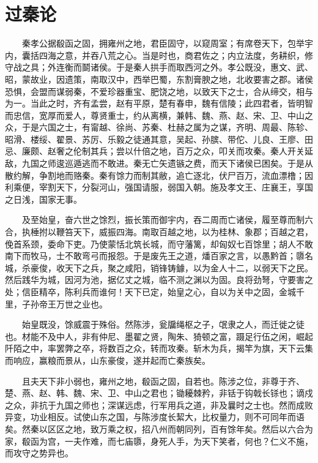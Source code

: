 \section{过秦论}


　　秦孝公据殽函之固，拥雍州之地，君臣固守，以窥周室；有席卷天下，包举宇内，囊括四海之意，并吞八荒之心。当是时也，商君佐之；内立法度，务耕织，修守战之具；外连衡而鬬诸侯。于是秦人拱手而取西河之外。孝公既没，惠文、武、昭，蒙故业，因遗策，南取汉中，西举巴蜀，东割膏腴之地，北收要害之郡。诸侯恐惧，会盟而谋弱秦，不爱珍器重宝、肥饶之地，以致天下之士，合从缔交，相与为一。当此之时，齐有孟尝，赵有平原，楚有春申，魏有信陵；此四君者，皆明智而忠信，宽厚而爱人，尊贤重士，约从离横，兼韩、魏、燕、赵、宋、卫、中山之众，于是六国之士，有甯越、徐尚、苏秦、杜赫之属为之谋，齐明、周最、陈轸、昭滑、楼绥、翟景、苏厉、乐毅之徒通其意，吴起、孙膑、带佗、儿良、王廖、田忌、廉颇、赵奢之伦制其兵；尝以什倍之地，百万之众，叩关而攻秦。秦人开关延敌，九国之师逡巡遁逃而不敢进。秦无亡矢遗镞之费，而天下诸侯已困矣。于是从散约解，争割地而赂秦。秦有馀力而制其敝，追亡逐北，伏尸百万，流血漂橹；因利乘便，宰割天下，分裂河山，强国请服，弱国入朝。施及孝文王、庄襄王，享国之日浅，国家无事。


　　及至始皇，奋六世之馀烈，振长策而御宇内，吞二周而亡诸侯，履至尊而制六合，执棰拊以鞭笞天下，威振四海。南取百越之地，以为桂林、象郡；百越之君，俛首系颈，委命下吏。乃使蒙恬北筑长城，而守藩篱，却匈奴七百馀里；胡人不敢南下而牧马，士不敢弯弓而报怨。于是废先王之道，燔百家之言，以愚黔首；隳名城，杀豪俊，收天下之兵，聚之咸阳，销锋铸鐻，以为金人十二，以弱天下之民。然后践华为城，因河为池，据亿丈之城，临不测之渊以为固。良将劲弩，守要害之处；信臣精卒，陈利兵而谁何！天下已定，始皇之心，自以为关中之固，金城千里，子孙帝王万世之业也。


　　始皇既没，馀威震于殊俗。然陈涉，瓮牖绳枢之子，氓隶之人，而迁徙之徒也。材能不及中人，非有仲尼、墨翟之贤，陶朱、猗顿之富，蹑足行伍之闲，崛起阡陌之中，率罢弊之卒，将数百之众，转而攻秦。斩木为兵，揭竿为旗，天下云集而响应，赢粮而景从，山东豪俊，遂并起而亡秦族矣。


　　且夫天下非小弱也，雍州之地，殽函之固，自若也。陈涉之位，非尊于齐、楚、燕、赵、韩、魏、宋、卫、中山之君也；锄耰棘矜，非铦于钩戟长铩也；谪戍之众，非抗于九国之师也；深谋远虑，行军用兵之道，非及曩时之士也。然而成败异变，功业相反。试使山东之国，与陈涉度长絜大，比权量力，则不可同年而语矣。然秦以区区之地，致万乘之权，招八州而朝同列，百有馀年矣。然后以六合为家，殽函为宫，一夫作难，而七庙隳，身死人手，为天下笑者，何也？仁义不施，而攻守之势异也。


